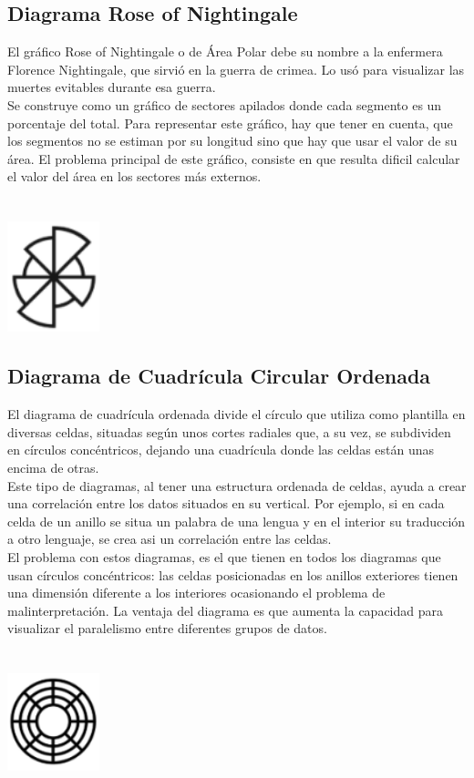 \documentclass{article}\usepackage[]{graphicx}\usepackage[]{color}
\begin{document}
\subsection{Diagrama Rose of Nightingale}
El gr\'afico Rose of Nightingale o de \'Area Polar debe su nombre a la enfermera Florence Nightingale, que sirvi\'o en la guerra de crimea. Lo us\'o para visualizar las muertes evitables durante esa guerra.~\\
Se construye como un gr\'afico de sectores apilados donde cada segmento es un porcentaje del total. Para representar este gr\'afico, hay que tener en cuenta, que los segmentos no se estiman por su longitud sino que hay que usar el valor de su \'area. El problema principal de este gr\'afico, consiste en que resulta dificil calcular el valor del \'area en los sectores m\'as externos.
~\\~\\~\\
\vbox{
    \centering
    \includegraphics[width=0.2\textwidth]{imag/rose}
}
\subsection{Diagrama de Cuadr\'icula Circular Ordenada}
El diagrama de cuadr\'icula ordenada divide el c\'irculo que utiliza como plantilla en diversas celdas, situadas seg\'un unos cortes radiales que, a su vez, se subdividen en c\'irculos conc\'entricos, dejando una cuadr\'icula donde las celdas est\'an unas encima de otras.~\\
Este tipo de diagramas, al tener una estructura ordenada de celdas, ayuda a crear una correlaci\'on entre los datos situados en su vertical. Por ejemplo, si en cada celda de un anillo se situa un palabra de una lengua y en el interior su traducci\'on a otro lenguaje, se crea asi un correlaci\'on entre las celdas.~\\
El problema con estos diagramas, es el que tienen en todos los diagramas que usan c\'irculos conc\'entricos: las celdas posicionadas en los anillos exteriores tienen una dimensi\'on diferente a los interiores ocasionando el problema de malinterpretaci\'on. La ventaja del diagrama es que aumenta la capacidad para visualizar el paralelismo entre diferentes grupos de datos. 
~\\~\\~\\
\vbox{
    \centering
    \includegraphics[width=0.2\textwidth]{imag/cu_ord}
}
\clearpage
\end{document}

